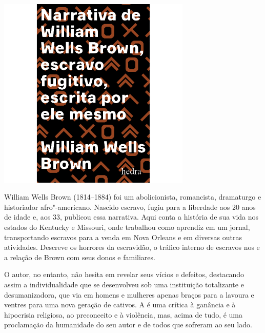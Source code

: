 \begin{center}
\hspace*{-2.5cm}
\hspace*{2.5cm}\includegraphics[width=92mm]{./grid/brown.jpg}
\end{center}

\hspace*{-7cm}\hrulefill\hspace*{-7cm}

\medskip

\noindent{}William Wells Brown (1814--1884) foi um abolicionista, romancista, dramaturgo e historiador afro"-americano. Nascido escravo, fugiu para a liberdade aos 20 anos de idade e, aos 33, publicou essa narrativa. Aqui conta a história de sua vida nos estados do Kentucky e Missouri, onde trabalhou como aprendiz em um jornal, transportando escravos para a venda em Nova Orleans e em diversas outras atividades. Descreve os horrores da escravidão, o tráfico interno de escravos nos  e a relação de Brown com seus donos e familiares.

O autor, no entanto, não hesita em revelar seus vícios e defeitos, destacando assim a individualidade que se desenvolveu sob uma instituição totalizante e desumanizadora, que via em homens e mulheres apenas braços para a lavoura e ventres para uma nova geração de cativos. A {} é uma crítica à ganância e à hipocrisia religiosa, ao preconceito e à violência, mas, acima de tudo, é uma proclamação da humanidade do seu autor e de todos que sofreram ao seu lado.

\vfill

